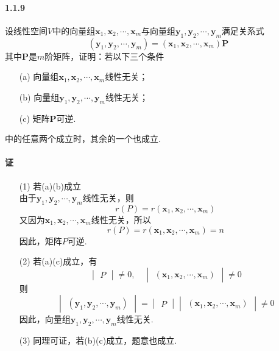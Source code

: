 \documentclass[12pt, a4paper, oneside, fontset=none]{ctexart}
\begin{document}
\paragraph*{1.1.9} 设线性空间$V$中的向量组$\bm{x}_1,\bm{x}_2,\bm{\cdots},\bm{x}_m$与向量组$\bm{y}_1,\bm{y}_2,\bm{\cdots},\bm{y}_m$满足关系式
\[
    (\bm{y}_1,\bm{y}_2,\bm{\cdots},\bm{y}_m) = (\bm{x}_1,\bm{x}_2,\bm{\cdots},\bm{x}_m) \bm{P}
\]
其中$\bm{P}$是$m$阶矩阵，证明：若以下三个条件
\begin{enumerate}
    \item[(a)] 向量组$\bm{x}_1,\bm{x}_2,\bm{\cdots},\bm{x}_m$线性无关；
    \item[(b)] 向量组$\bm{y}_1,\bm{y}_2,\bm{\cdots},\bm{y}_m$线性无关；
    \item[(c)] 矩阵$\bm{P}$可逆.
\end{enumerate}
中的任意两个成立时，其余的一个也成立.

\paragraph*{证}
\begin{enumerate}
    \item[(1)] 若(a)(b)成立\\
        由于$\bm{y}_1,\bm{y}_2,\bm{\cdots},\bm{y}_m$线性无关，则
        \[
            r(P) = r(\bm{x}_1,\bm{x}_2,\bm{\cdots},\bm{x}_m)
        \]
        又因为$\bm{x}_1,\bm{x}_2,\bm{\cdots},\bm{x}_m$线性无关，所以
        \[
            r(P) = r(\bm{x}_1,\bm{x}_2,\bm{\cdots},\bm{x}_m) = n
        \]
        因此，矩阵$P$可逆.
    \item[(2)] 若(a)(c)成立，有
        \[
            \begin{vmatrix}
                P
            \end{vmatrix} \neq 0, \quad \begin{vmatrix}
                (\bm{x}_1,\bm{x}_2,\bm{\cdots},\bm{x}_m)
            \end{vmatrix} \neq 0
        \]
        则
        \[
            \begin{vmatrix}
                (\bm{y}_1,\bm{y}_2,\bm{\cdots},\bm{y}_m)
            \end{vmatrix} = \begin{vmatrix}
                P
            \end{vmatrix} \begin{vmatrix}
                (\bm{x}_1,\bm{x}_2,\bm{\cdots},\bm{x}_m)
            \end{vmatrix} \neq 0
        \]
        因此，向量组$\bm{y}_1,\bm{y}_2,\bm{\cdots},\bm{y}_m$线性无关.
    \item[(3)] 同理可证，若(b)(c)成立，题意也成立.
\end{enumerate}
\end{document}
